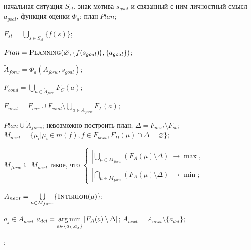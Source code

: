 	\Require начальная ситуация $S_{st}$, знак мотива $s_{goal}$ и связанный с ним личностный смысл $a_{goal}$, функция оценки $\Phi_a$;
	\Ensure план $Plan$;
	\algrule
	
	\State $F_{st}=\bigcup\limits_{s\in S_{st}}\{f(s)\}$; 
			
	\State $Plan=\Call{Planning}{\varnothing, \{f(s_{goal})\}, \{a_{goal}\}}$;

		\State $\tilde A_{forw}=\Phi_a(A_{forw},s_{goal})$; 
		
		\State $F_{cond} = \bigcup\limits_{a\in \tilde A_{forw}}F_C(a)$;

		\State $F_{next}=F_{cur}\cup F_{cond}\setminus\bigcup\limits_{a\in \tilde A_{forw}}F_A(a)$; 
		
			\State \Return $Plan\cup{\tilde A_{forw}}$;		
		\Else
				\State\Return невозможно построить план;
			\Else
				\State $\Delta=F_{next}\setminus F_{st}$; 					
				\State $M_{next}=\{\mu_i | \mu_i\in m(f), f\in F_{next},F_D(\mu)\cap\Delta=\varnothing\}$;
				
				\State $M_{forw}\subseteq M_{next}$ такое, что $\begin{cases}
				\left|\bigcup\limits_{\mu\in M_{forw}}\left(F_A(\mu)\setminus\Delta\right)\right|\rightarrow\max,\\
				\left|\bigcap\limits_{\mu\in M_{forw}}\left(F_A(\mu)\setminus\Delta\right)\right|\rightarrow\min;
				\end{cases}$ 
				
				\State $A_{next} = \bigcup\limits_{\mu\in M_{forw}}\{\Call{Interior}{\mu}\}$; 
				
				\ForAll $a_j\in A_{next}$
						\State $a_{del}=\operatorname*{arg\,min}\limits_{a\in\{a_k,a_j\}}|F_A(a)\setminus\Delta|$;
						\State $A_{next}= A_{next}\setminus\{a_{del}\}$; 
					\EndIf
				\EndFor
				
				\State \Return {};						
			\EndIf
		\EndIf

	\EndFunction